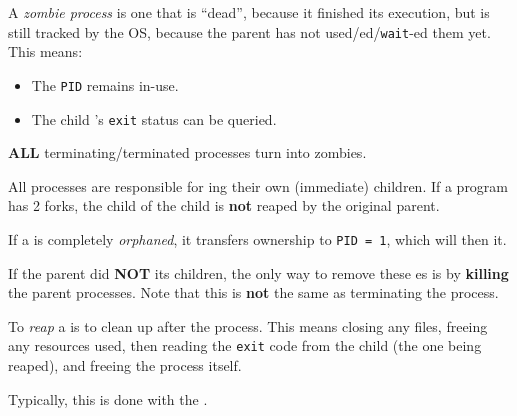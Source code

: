 \begin{definition}\label{def:Zombie_Process}
  A \emph{zombie process} is one that is ``dead'', because it finished its execution, but is still tracked by the OS, because the parent has not used/ed/\texttt{wait}-ed them yet.\@
  This means:
  \begin{itemize}[noitemsep]
  \item The \texttt{PID} remains in-use.
  \item The child 's \texttt{exit} status can be queried.
   \end{itemize}

   \textbf{ALL} terminating/terminated processes turn into zombies.

   \begin{remark}\label{rmk:Process_Responsible_Reaping}
     All processes are responsible for ing their own (immediate) children.
     If a program has 2 forks, the child of the child is \textbf{not} reaped by the original parent.
   \end{remark}

   \begin{remark}\label{rmk:Orphaned_Process}
    If a  is completely \emph{orphaned}, it transfers ownership to \texttt{PID = 1}, which will then  it.
  \end{remark}
\end{definition}

If the parent  did \textbf{NOT}  its children, the only way to remove these es is by \textbf{killing} the parent processes.
Note that this is \textbf{not} the same as terminating the process.

\begin{definition}[Reap]\label{def:Reap}
  To \emph{reap} a  is to clean up after the process.
  This means closing any files, freeing any resources used, then reading the \texttt{exit} code from the child (the one being reaped), and freeing the process itself.

  Typically, this is done with the  .
\end{definition}

